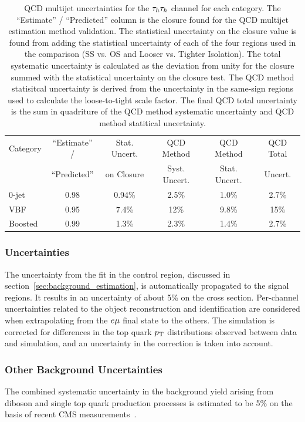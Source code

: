 \begin{table}[htbp]
\centering
\begin{tabular}{|l|c|c|c|c|c|}
\hline
Category & ``Estimate'' /  & Stat. Uncert. &  QCD Method    &  QCD Method    &  QCD Total \\
         & ``Predicted''   &    on Closure &  Syst. Uncert. &  Stat. Uncert. &  Uncert.   \\
\hline
0-jet    & 0.98 & 0.94\% & 2.5\% & 1.0\%  & 2.7\%  \\\hline
VBF      & 0.95 & 7.4\%  & 12\%  & 9.8\%  & 15\%   \\\hline
Boosted  & 0.99 & 1.3\%  & 2.3\% & 1.4\%  & 2.7\%  \\\hline
\end{tabular}
\label{tab:htt_tt_qcd_closure}
\caption{
QCD multijet uncertainties for the $\tau_{h}\tau_{h}$ channel for each category. The ``Estimate'' /
``Predicted'' column is the closure found for the QCD multijet estimation method validation.
The statistical uncertainty on the closure value is found from adding the statistical uncertainty
of each of the four regions used in the comparison (SS vs. OS and Looser vs. Tighter Isolation).
The total systematic uncertainty is calculated as the deviation from unity for the closure summed
with the statistical uncertainty on the closure test. The QCD method statisitcal uncertainty
is derived from the uncertainty in the same-sign regions used to calculate the loose-to-tight
scale factor. The final QCD total uncertainty is the sum in quadriture of the QCD method systematic
uncertainty and QCD method statitical uncertainty.
}
\end{table}


\subsubsection{\ttbar Uncertainties}
The uncertainty from the fit in the \ttbar control region, discussed in section~\ref{sec:background_estimation}, 
is automatically propagated to the signal regions. It results in an uncertainty of about 5\% on the 
\ttbar cross section. Per-channel uncertainties related to the object reconstruction and identification are 
considered when extrapolating from the $e\mu$ final state to the others. The \ttbar simulation is corrected 
for differences in the top quark $p_\mathrm{T}$ distributions observed between data and simulation, and an uncertainty 
in the correction is taken into account.


\subsubsection{Other Background Uncertainties}
The combined systematic uncertainty in the background yield arising from diboson and single top quark production 
processes is estimated to be 5\%
on the basis of recent CMS measurements~\cite{Khachatryan:2016tgp,Sirunyan:2016cdg}.


